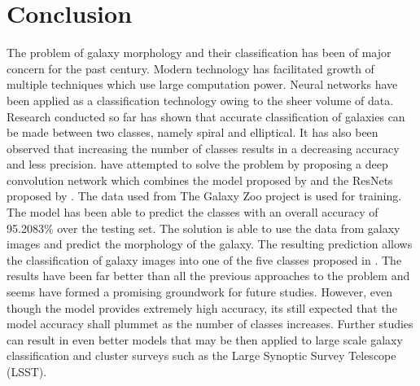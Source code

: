\documentclass[a4paper,12pt]{report}
\begin{document}
\chapter{Conclusion}
\hspace*{0.5 in}The problem of galaxy morphology and their classification has been of major concern for the past century. Modern technology has facilitated growth of multiple techniques which use large computation power. Neural networks have been applied as a classification technology owing to the sheer volume of data. Research conducted so far has shown that accurate classification of galaxies can be made between two classes, namely spiral and elliptical. It has also been observed that increasing the number of classes results in a decreasing accuracy and less precision. \citet{dai2018galaxy} have attempted to solve the problem by proposing a deep convolution network which combines the model proposed by \citet{Dieleman2015} and the ResNets proposed by \citet{He_2016}. The data used from The Galaxy Zoo project \citep{Willett_2013} is used for training. The model has been able to predict the classes with an overall accuracy of 95.2083\% over the testing set. The solution is able to use the data from galaxy images and predict the morphology of the galaxy. The resulting prediction allows the classification of galaxy images into one of the five classes proposed in \citep{dai2018galaxy}. The results have been far better than all the previous approaches to the problem and seems have formed a promising groundwork for future studies. However, even though the model provides extremely high accuracy, its still expected that the model accuracy shall plummet as the number of classes increases. Further studies can result in even better models that may be then applied to large scale galaxy classification and cluster surveys such as the Large Synoptic Survey Telescope (LSST).

\renewcommand\bibname{References}


\end{document}
